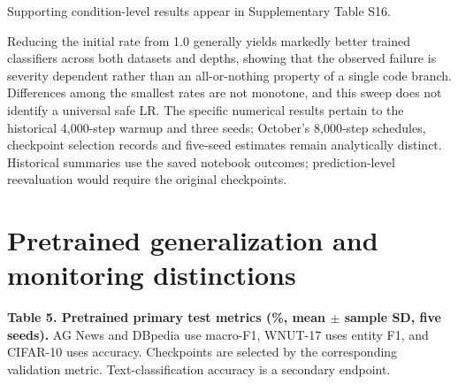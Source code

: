\documentclass[referee,pdflatex,sn-mathphys-num]{sn-jnl}
\begin{document}
Supporting condition-level results appear in Supplementary Table S16.

Reducing the initial rate from 1.0 generally yields markedly better trained classifiers across both datasets and depths, showing that the observed failure is severity dependent rather than an all-or-nothing property of a single code branch. Differences among the smallest rates are not monotone, and this sweep does not identify a universal safe LR. The specific numerical results pertain to the historical 4,000-step warmup and three seeds; October's 8,000-step schedules, checkpoint selection records and five-seed estimates remain analytically distinct. Historical summaries use the saved notebook outcomes; prediction-level reevaluation would require the original checkpoints.


\section{Pretrained generalization and monitoring distinctions}\label{pretrained-generalization-and-monitoring-distinctions}


\textbf{Table 5. Pretrained primary test metrics (\%, mean \(\pm\) sample SD, five seeds).} AG News and DBpedia use macro-F1, WNUT-17 uses entity F1, and CIFAR-10 uses accuracy. Checkpoints are selected by the corresponding validation metric. Text-classification accuracy is a secondary endpoint.
\end{document}
